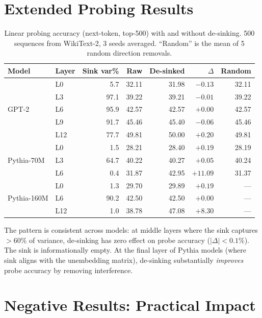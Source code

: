 \documentclass[11pt]{article}
\begin{document}
\section{Extended Probing Results}\label{app:probing}

\begin{table}[h]
\centering
\caption{Linear probing accuracy (next-token, top-500) with and without de-sinking. 500 sequences from WikiText-2, 3 seeds averaged. ``Random'' is the mean of 5 random direction removals.}
\small
\begin{tabular}{@{}llrrrrr@{}}
\toprule
\textbf{Model} & \textbf{Layer} & \textbf{Sink var\%} & \textbf{Raw} & \textbf{De-sinked} & \textbf{$\Delta$} & \textbf{Random} \\
\midrule
\multirow{5}{*}{GPT-2} & L0 & 5.7 & 32.11 & 31.98 & $-0.13$ & 32.11 \\
& L3 & 97.1 & 39.22 & 39.21 & $-0.01$ & 39.22 \\
& L6 & 95.9 & 42.57 & 42.57 & $+0.00$ & 42.57 \\
& L9 & 91.7 & 45.46 & 45.40 & $-0.06$ & 45.46 \\
& L12 & 77.7 & 49.81 & 50.00 & $+0.20$ & 49.81 \\
\midrule
\multirow{3}{*}{Pythia-70M} & L0 & 1.5 & 28.21 & 28.40 & $+0.19$ & 28.19 \\
& L3 & 64.7 & 40.22 & 40.27 & $+0.05$ & 40.24 \\
& L6 & 0.4 & 31.87 & 42.95 & $\mathbf{+11.09}$ & 31.37 \\
\midrule
\multirow{3}{*}{Pythia-160M} & L0 & 1.3 & 29.70 & 29.89 & $+0.19$ & --- \\
& L6 & 90.2 & 42.50 & 42.50 & $+0.00$ & --- \\
& L12 & 1.0 & 38.78 & 47.08 & $\mathbf{+8.30}$ & --- \\
\bottomrule
\end{tabular}
\label{tab:probing}
\end{table}

The pattern is consistent across models: at middle layers where the sink captures $>60\%$ of variance, de-sinking has zero effect on probe accuracy ($|\Delta| < 0.1\%$). The sink is informationally empty. At the final layer of Pythia models (where sink aligns with the unembedding matrix), de-sinking substantially \emph{improves} probe accuracy by removing interference.

\section{Negative Results: Practical Impact}\label{app:negative}
\end{document}

